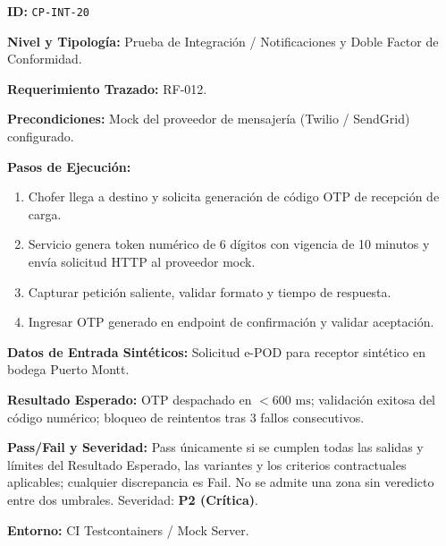 \par\noindent\textbf{ID:} \texttt{C\allowbreak{}P\allowbreak{}-\allowbreak{}I\allowbreak{}N\allowbreak{}T\allowbreak{}-\allowbreak{}2\allowbreak{}0\allowbreak{}}\par
\par\noindent\textbf{Nivel y Tipología:} Prueba de Integración / Notificaciones y Doble Factor de Conformidad.\par
\par\noindent\textbf{Requerimiento Trazado:} RF-012.\par
\par\noindent\textbf{Precondiciones:} Mock del proveedor de mensajería (Twilio / SendGrid) configurado.\par
\par\noindent\textbf{Pasos de Ejecución:} \par
\begin{enumerate}
\item Chofer llega a destino y solicita generación de código OTP de recepción de carga.
\item Servicio genera token numérico de 6 dígitos con vigencia de 10 minutos y envía solicitud HTTP al proveedor mock.
\item Capturar petición saliente, validar formato y tiempo de respuesta.
\item Ingresar OTP generado en endpoint de confirmación y validar aceptación.
\end{enumerate}
\par\noindent\textbf{Datos de Entrada Sintéticos:} Solicitud e-POD para receptor sintético en bodega Puerto Montt.\par
\par\noindent\textbf{Resultado Esperado:} OTP despachado en \(< 600\text{ ms}\); validación exitosa del código numérico; bloqueo de reintentos tras 3 fallos consecutivos.\par
\par\noindent\textbf{Pass/Fail y Severidad:} Pass únicamente si se cumplen todas las salidas y límites del Resultado Esperado, las variantes y los criterios contractuales aplicables; cualquier discrepancia es Fail. No se admite una zona sin veredicto entre dos umbrales. Severidad: \textbf{P2 (Crítica)}.\par
\par\noindent\textbf{Entorno:} CI Testcontainers / Mock Server.\par







